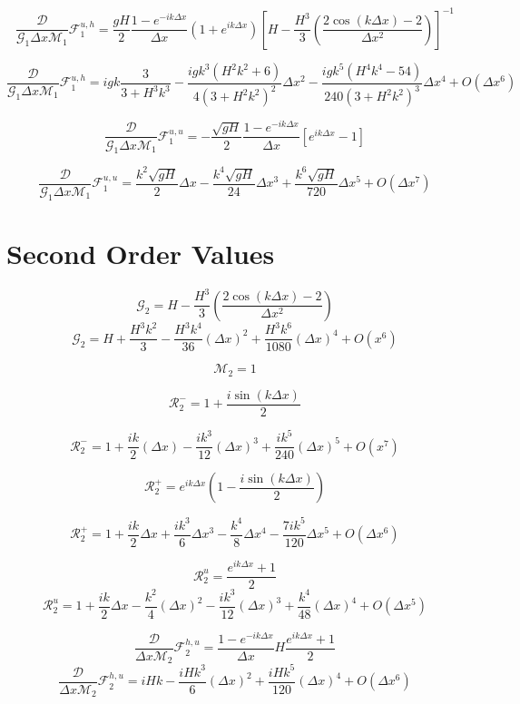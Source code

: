 \documentclass[12pt]{article}
\begin{document}
\[\frac{\mathcal{D}}{\mathcal{G}_1\Delta x\mathcal{M}_1}\mathcal{F}^{u,h}_1 = \dfrac{ gH}{ 2}\frac{1 -e^{-ik\Delta x}}{\Delta x} \left(1 + e^{ik\Delta x}\right)\left[H - \frac{H^3}{3}\left(\frac{ 2\cos\left(k\Delta x\right) - 2 }{\Delta x^2}\right) \right]^{-1}\]

\[\frac{\mathcal{D}}{\mathcal{G}_1\Delta x\mathcal{M}_1}\mathcal{F}^{u,h}_1 = igk\frac{3}{3 + H^3k^3} - \frac{igk^3\left(H^2k^2 + 6\right)}{4\left(3 + H^2k^2\right)^2}\Delta x ^2 - \frac{igk^5\left(H^4k^4 - 54\right)}{240\left(3 + H^2k^2\right)^3}\Delta x ^4 + O(\Delta x^6)\]



\[\frac{\mathcal{D}}{\mathcal{G}_1\Delta x\mathcal{M}_1}\mathcal{F}^{u,u}_1 = - \dfrac{ \sqrt{gH}}{ 2}\frac{1 -e^{-ik\Delta x}}{\Delta x} \left [ e^{ik\Delta x}  -  1  \right ]\]


\[\frac{\mathcal{D}}{\mathcal{G}_1\Delta x\mathcal{M}_1}\mathcal{F}^{u,u}_1 = \frac{k^2\sqrt{gH} }{ 2}  \Delta x - \frac{k^4\sqrt{gH}}{ 24}  \Delta x^3 + \frac{k^6\sqrt{gH}}{ 720}  \Delta x^5 + O( \Delta x^7)\]


\section{Second Order Values }
\[\mathcal{G}_2 = H - \frac{H^3}{3}\left(\frac{ 2\cos\left(k\Delta x\right) - 2 }{\Delta x^2}\right)\]
\[\mathcal{G}_2 = H +\frac{H^3 k^2}{3}  -\frac{H^3 k^4}{36}(\Delta x)^2 + \frac{H^3 k^6}{1080}(\Delta x)^4 + O(x^{6})\]

\[\mathcal{M}_2 = 1\]


\[\mathcal{R}_2^- = 1  + \frac{i\sin\left(k\Delta x\right)}{2}\]

\[\mathcal{R}_2^- = 1  + \frac{ik}{2} (\Delta x) - \frac{ik^3}{12}(\Delta x)^3 + \frac{ik^5}{240}(\Delta x)^5  +  O(x^{7})\]


\[\mathcal{R}_2^+ = e^{ik\Delta x}\left(1  - \frac{i\sin\left(k\Delta x\right)}{2} \right)\]

\[\mathcal{R}_2^+ =1 + \frac{ik}{2}\Delta x + \frac{i k^3}{6} \Delta x^3 - \frac{k^4}{8} \Delta x^4  - \frac{7ik^5}{120} \Delta x^5 + O\left(\Delta x ^6\right)\]


\[\mathcal{R}^u_2 = \frac{e^{ik\Delta x } + 1}{2} \]
\[\mathcal{R}^u_2 = 1 + \frac{ik}{2}\Delta x - \frac{k^2}{4} (\Delta x)^2 - \frac{i k^3}{12} ( \Delta x)^3 + \frac{k^4}{48} ( \Delta x)^4+  O( \Delta x^5)\]


\[\frac{\mathcal{D}}{\Delta x\mathcal{M}_2}\mathcal{F}^{h,u}_2 = \frac{1 -e^{-ik\Delta x}}{\Delta x}H\frac{e^{ik\Delta x } + 1}{2}\]
\[\frac{\mathcal{D}}{\Delta x\mathcal{M}_2}\mathcal{F}^{h,u}_2 = iHk  - \frac{iHk^3}{6}( \Delta x)^2 + \frac{iHk^5}{120}( \Delta x)^4 +  O( \Delta x^6)\]
\end{document}
